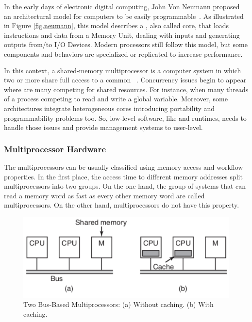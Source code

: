 		In the early days of electronic digital computing, John Von Neumann
		proposed an architectural model for computers to be easily programmable~\cite{von-neumann:model}.
		As illustrated in Figure \ref{fig.neumann}, this model describes a \cpu,
		also called core, that loads instructions and data from a Memory Unit,
		dealing with inputs and generating outputs from/to I/O Devices.
		Modern processors still follow this model, but some components and
		behaviors are specialized or replicated to increase performance.

		In this context, a shared-memory multiprocessor is a computer system
		in which two or more \cpus share full access to a common \ram~\cite{tanenbaum:4ed}.
		Concurrency issues begin to appear where are many \cpus competing for
		shared resources.
		For instance, when many threads of a process competing to read and write a global variable.
		Moreover, some architectures integrate heterogeneous cores introducing portability
		and programmability problems too.
		So, low-level software, like \oses and runtimes, needs to handle those
		issues and provide management systems to user-level.

		\subsubsection{Multiprocessor Hardware}
		\label{sec.multiprocessor-hw}

			The multiprocessors can be usually classified using memory access
			and workflow properties.
			In the first place, the access time to different memory addresses
			split multiprocessors into two groups.
			On the one hand, the group of systems that can read a memory word
			as fast as every other memory word are called \uma multiprocessors.
			On the other hand, \numa multiprocessors do not have this property.

			\begin{figure}[h]
				\centering
				\includegraphics[width=.9\textwidth]{images/uma.png}

				\caption{
					Two Bus-Based \uma Multiprocessors: (a) Without caching. (b) With caching.
				}\par
				\label{fig.uma}
			\end{figure}


